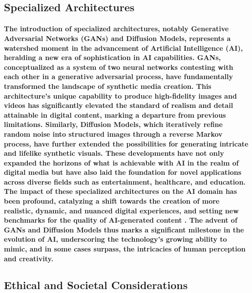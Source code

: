 \documentclass[11pt,a4paper,oneside]{report}
\begin{document}
\subsection{Specialized Architectures}
\paragraph{The introduction of specialized architectures, notably Generative Adversarial Networks (GANs) and Diffusion Models, represents a watershed moment in the advancement of Artificial Intelligence (AI), heralding a new era of sophistication in AI capabilities. GANs, conceptualized as a system of two neural networks contesting with each other in a generative adversarial process, have fundamentally transformed the landscape of synthetic media creation. This architecture's unique capability to produce high-fidelity images and videos has significantly elevated the standard of realism and detail attainable in digital content, marking a departure from previous limitations. Similarly, Diffusion Models, which iteratively refine random noise into structured images through a reverse Markov process, have further extended the possibilities for generating intricate and lifelike synthetic visuals. These developments have not only expanded the horizons of what is achievable with AI in the realm of digital media but have also laid the foundation for novel applications across diverse fields such as entertainment, healthcare, and education. The impact of these specialized architectures on the AI domain has been profound, catalyzing a shift towards the creation of more realistic, dynamic, and nuanced digital experiences, and setting new benchmarks for the quality of AI-generated content \cite{granot2022drop}. The advent of GANs and Diffusion Models thus marks a significant milestone in the evolution of AI, underscoring the technology's growing ability to mimic, and in some cases surpass, the intricacies of human perception and creativity.}

\subsection{Ethical and Societal Considerations}
\end{document}
